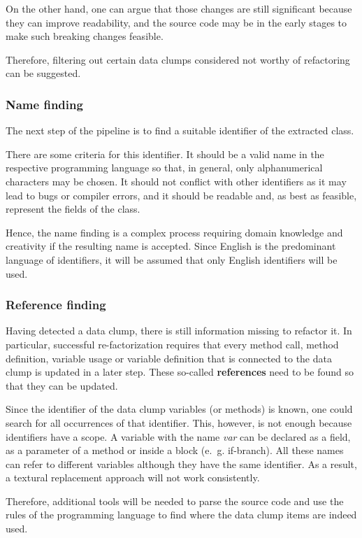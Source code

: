 On the other hand, one can argue that those changes are still significant because they can improve readability, and the source code may be in the early stages to make such breaking changes feasible. 

Therefore, filtering out certain data clumps considered not worthy of refactoring can be suggested.

\subsubsection{Name finding}\label{subsec:chap3_data_clump_name_finding}
The next step of the pipeline is to find a suitable identifier of the extracted class.

There are some criteria for this identifier. It should be a valid name in the respective programming language so that, in general, only alphanumerical characters may be chosen. It should not conflict with other identifiers as it may lead to bugs or compiler errors, and it should be readable and, as best as feasible, represent the fields of the class.

Hence, the name finding is a complex process requiring domain knowledge and creativity if the resulting name is accepted. 
Since English is the predominant language of identifiers, it will be assumed that only English identifiers will be used. 

\subsubsection{Reference finding}
 Having detected a data clump, there is still information missing to refactor it. In particular, successful re-factorization requires that every method call, method definition, variable usage or variable definition that is connected to the data clump is updated in a later step. These so-called \textbf{references} need to be found so that they can be updated.

Since the identifier of the data clump variables (or methods) is known, one could search for all occurrences of that identifier. This, however, is not enough because identifiers have a scope. A variable with the name \textit{var} can be declared as a field, as a parameter of a method or inside a block (e.~g. if-branch). All these names can refer to different variables although they have the same identifier. As a result, a textural replacement approach will not work consistently.

Therefore, additional tools will be needed to parse the source code and use the rules of the programming language to find where the data clump items are indeed used.
